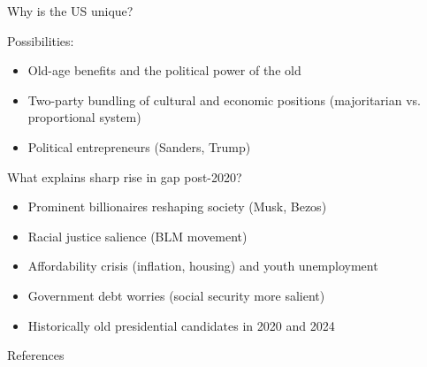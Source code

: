 \documentclass[aspectratio=169]{beamer}
\begin{document}
\begin{frame}{Why is the US unique?}

Possibilities:
\begin{itemize}
    \item Old-age benefits and the political power of the old
    \item Two-party bundling of cultural and economic positions (majoritarian vs. proportional system)
    \item Political entrepreneurs (Sanders, Trump)
\end{itemize}
What explains sharp rise in gap post-2020?
\begin{itemize}
    \item Prominent billionaires reshaping society (Musk, Bezos)
    \item Racial justice salience (BLM movement)
    \item Affordability crisis (inflation, housing) and youth unemployment
    \item Government debt worries (social security more salient)
    \item Historically old presidential candidates in 2020 and 2024
\end{itemize}

\end{frame}



\begin{frame}[allowframebreaks]{References}



\nocite{evs_wvs_joint}
\nocite{gss2024}
\nocite{anes_cumulative}


\end{frame}
\end{document}
